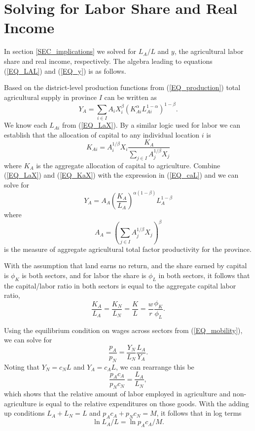 \documentclass[11pt]{article}
\begin{document}
\section{Solving for Labor Share and Real Income}\label{APP_solve}
In section \ref{SEC_implications} we solved for $L_A/L$ and $y$, the agricultural labor share and real income, respectively. The algebra leading to equations (\ref{EQ_LAL}) and (\ref{EQ_y}) is as follows.

Based on the district-level production functions from (\ref{EQ_production}) total agricultural supply in province $I$ can be written as
\begin{equation}
Y_A = \sum_{i \in I} A_{i} X_{i}^{\beta} \left(K_{Ai}^{\alpha}L_{Ai}^{1-\alpha}\right)^{1-\beta}. \label{EQ_caL}
\end{equation}
We know each $L_{Ai}$ from (\ref{EQ_LaX}). By a similar logic used for labor we can establish that the allocation of capital to any individual location $i$ is
\begin{equation}
    K_{Ai} = A_{i}^{1/\beta} X_i \frac{K_A}{\sum_{j\in I} A_{j}^{1/\beta}X_{j}} \label{EQ_KaX}
\end{equation}
where $K_A$ is the aggregate allocation of capital to agriculture. Combine (\ref{EQ_LaX}) and (\ref{EQ_KaX}) with the expression in (\ref{EQ_caL}) and we can solve for 
\begin{equation}
    Y_A = A_A \left(\frac{K_A}{L_A}\right)^{\alpha(1-\beta)} L_A^{1-\beta} \nonumber
\end{equation}
where 
\begin{equation}
    A_A = \left(\sum_{j\in I} A_{j}^{1/\beta}X_{j} \right)^\beta \nonumber
\end{equation}
is the measure of aggregate agricultural total factor productivity for the province. 

With the assumption that land earns no return, and the share earned by capital is $\phi_K$ is both sectors, and for labor the share is $\phi_L$ in both sectors, it follows that the capital/labor ratio in both sectors is equal to the aggregate capital labor ratio,
\begin{equation}
    \frac{K_A}{L_A} = \frac{K_N}{L_N} = \frac{K}{L} = \frac{w}{r}\frac{\phi_K}{\phi_L}. \nonumber
\end{equation}

Using the equilibrium condition on wages across sectors from (\ref{EQ_mobility}), we can solve for 
\begin{equation}
    \frac{p_A}{p_N} = \frac{Y_N}{L_N}\frac{L_A}{Y_A}.\label{EQ_papn}
\end{equation}
Noting that $Y_N = c_N L$ and $Y_A = c_A L$, we can rearrange this be
\begin{equation}
    \frac{p_A c_A}{p_N c_N} = \frac{L_A}{L_N}, \label{EQ_expend}
\end{equation}
which shows that the relative amount of labor employed in agriculture and non-agriculture is equal to the relative expenditures on those goods. With the adding up conditions $L_A + L_N = L$ and $p_Ac_A + p_N c_N = M$, it follows that in log terms
\begin{equation}
    \ln L_A/L = \ln p_A c_A/M. \label{EQ_pacaM}
\end{equation}
\end{document}
